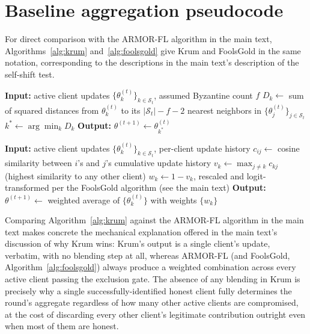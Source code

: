 \documentclass[a4paper,11pt]{article}
\begin{document}
\section{Baseline aggregation pseudocode}\label{app:baselines}

For direct comparison with the ARMOR-FL algorithm in the main text, Algorithms~\ref{alg:krum} and~\ref{alg:foolsgold} give Krum and FoolsGold in the same notation, corresponding to the descriptions in the main text's description of the self-shift test.

\begin{algorithm}
\caption{Krum aggregation, one round}\label{alg:krum}
\begin{algorithmic}[1]
\State \textbf{Input:} active client updates $\{\theta_k^{(t)}\}_{k \in \mathcal{S}_t}$, assumed Byzantine count $f$
  \State $D_k \gets$ sum of squared distances from $\theta_k^{(t)}$ to its $|\mathcal{S}_t|-f-2$ nearest neighbors in $\{\theta_j^{(t)}\}_{j \in \mathcal{S}_t}$
\EndFor
\State $k^* \gets \arg\min_k D_k$
\State \textbf{Output:} $\theta^{(t+1)} \gets \theta_{k^*}^{(t)}$
\end{algorithmic}
\end{algorithm}

\begin{algorithm}
\caption{FoolsGold aggregation, one round}\label{alg:foolsgold}
\begin{algorithmic}[1]
\State \textbf{Input:} active client updates $\{\theta_k^{(t)}\}_{k \in \mathcal{S}_t}$, per-client update history
  \State $c_{ij} \gets$ cosine similarity between $i$'s and $j$'s cumulative update history
\EndFor
{}
  \State $v_k \gets \max_{j \ne k} c_{kj}$ (highest similarity to any other client)
  \State $w_k \gets 1 - v_k$, rescaled and logit-transformed per the FoolsGold algorithm (see the main text)
\EndFor
\State \textbf{Output:} $\theta^{(t+1)} \gets$ weighted average of $\{\theta_k^{(t)}\}$ with weights $\{w_k\}$
\end{algorithmic}
\end{algorithm}

Comparing Algorithm~\ref{alg:krum} against the ARMOR-FL algorithm in the main text makes concrete the mechanical explanation offered in the main text's discussion of why Krum wins: Krum's output is a single client's update, verbatim, with no blending step at all, whereas ARMOR-FL (and FoolsGold, Algorithm~\ref{alg:foolsgold}) always produce a weighted combination across every active client passing the exclusion gate. The absence of any blending in Krum is precisely why a single successfully-identified honest client fully determines the round's aggregate regardless of how many other active clients are compromised, at the cost of discarding every other client's legitimate contribution outright even when most of them are honest.
\end{document}
